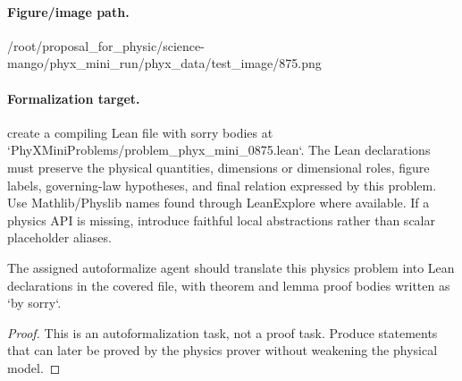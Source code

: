 \paragraph{Figure/image path.}
/root/proposal\_for\_physic/science-mango/phyx\_mini\_run/phyx\_data/test\_image/875.png

\paragraph{Formalization target.}
create a compiling Lean file with sorry bodies at `PhyXMiniProblems/problem\_phyx\_mini\_0875.lean`. The Lean declarations must preserve the physical quantities, dimensions or dimensional roles, figure labels, governing-law hypotheses, and final relation expressed by this problem.
Use Mathlib/Physlib names found through LeanExplore where available. If a physics API is missing, introduce faithful local abstractions rather than scalar placeholder aliases.

\begin{theorem}
\label{thm:physics:phyx_mini_0875:target}
The assigned autoformalize agent should translate this physics problem into Lean declarations in the covered file, with theorem and lemma proof bodies written as `by sorry`.
\end{theorem}
\begin{proof}
This is an autoformalization task, not a proof task. Produce statements that can later be proved by the physics prover without weakening the physical model.
\end{proof}

